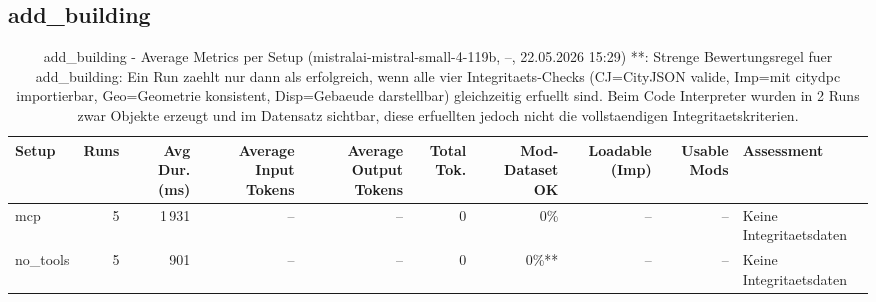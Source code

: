 \documentclass[a4paper,11pt]{article}
\begin{document}
\clearpage

\subsection{add\_building}

\begin{table}[H]
\centering
\scriptsize
\caption{add\_building - Average Metrics per Setup (mistralai-mistral-small-4-119b, --, 22.05.2026 15:29) **: Strenge Bewertungsregel fuer add\_building: Ein Run zaehlt nur dann als erfolgreich, wenn alle vier Integritaets-Checks (CJ=CityJSON valide, Imp=mit citydpc importierbar, Geo=Geometrie konsistent, Disp=Gebaeude darstellbar) gleichzeitig erfuellt sind. Beim Code Interpreter wurden in 2 Runs zwar Objekte erzeugt und im Datensatz sichtbar, diese erfuellten jedoch nicht die vollstaendigen Integritaetskriterien.}
\label{tab:combined\_add\_building\_metrics\_20260522}
\begin{tabular}{l r r r r r r r r l}
\toprule
Setup & Runs & Avg Dur. (ms) & Average Input Tokens & Average Output Tokens & Total Tok. & Mod-Dataset OK & Loadable (Imp) & Usable Mods & Assessment \\
\midrule
mcp & 5 & 1\,931 & -- & -- & 0 & 0\% & -- & -- & Keine Integritaetsdaten \\
no\_tools & 5 & 901 & -- & -- & 0 & 0\%** & -- & -- & Keine Integritaetsdaten \\
\bottomrule
\end{tabular}
\end{table}
\end{document}

